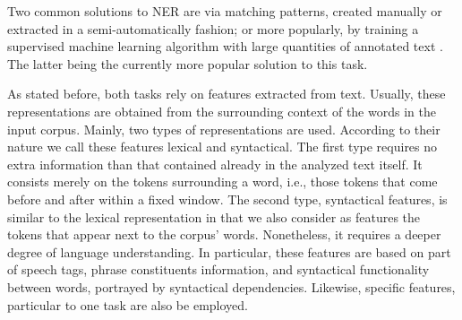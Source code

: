  Two common solutions to NER are via matching patterns, created manually or extracted in a semi-automatically fashion\cite{gupta2015distantly}; or more popularly, by training a supervised machine learning algorithm with large quantities of annotated text \cite{mining12Book} . The latter being the currently more popular solution to this task.






As stated before, both tasks rely on features extracted from text. Usually, these representations are obtained from the surrounding context of the words in the  input corpus. Mainly,  two types of representations are used. According to their nature we call these features lexical and syntactical. 	The first type requires no extra information than that contained already in the analyzed text itself. It consists merely on the tokens surrounding a word, i.e., those tokens that come before and after within a fixed window. The second type, syntactical features, is similar to the lexical representation in that we also consider as features the tokens that appear next to the corpus' words. Nonetheless, it requires a deeper degree of language understanding. In particular, these features are based on part of speech tags, phrase constituents information, and syntactical functionality between words, portrayed by syntactical dependencies. Likewise, specific features, particular to one task are also be employed.

